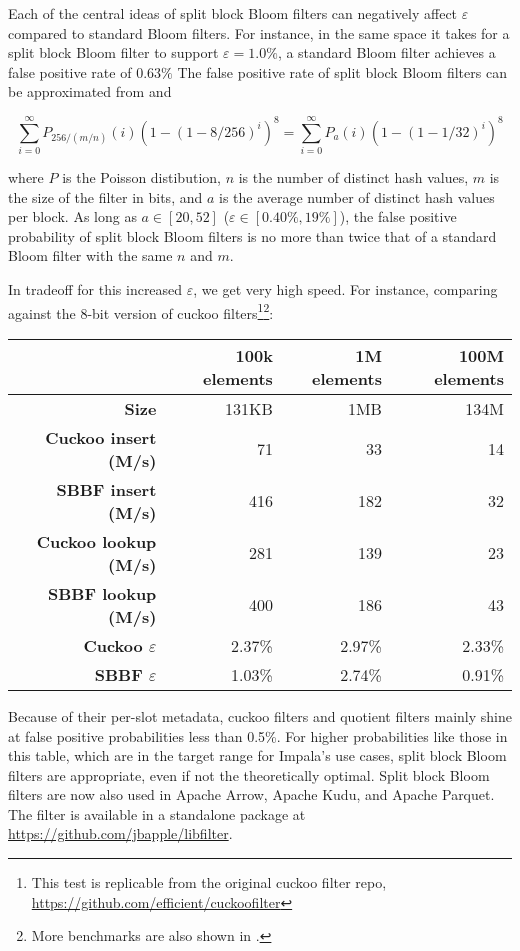 \documentclass[letterpaper, 11pt]{article}
\begin{document}
Each of the central ideas of split block Bloom filters can negatively affect $\varepsilon$ compared to standard Bloom filters.
For instance, in the same space it takes for a split block Bloom filter to support $\varepsilon = 1.0\%$, a standard Bloom filter achieves a false positive rate of $0.63\%$
The false positive rate of split block Bloom filters can be approximated from \cite[Equation 3]{block} and \cite[Section 2.1]{split-bloom}

\[
\sum_{i=0}^\infty P_{256/(m/n)}(i) (1 - (1-8/256)^i)^8
= \sum_{i=0}^\infty P_a(i) (1 - (1-1/32)^i)^8
\]

where $P$ is the Poisson distibution, $n$ is the number of distinct hash values, $m$ is the size of the filter in bits, and $a$ is the average number of distinct hash values per block.
As long as $a \in [20,52]$ ($\varepsilon \in [0.40\%, 19\%]$), the false positive probability of split block Bloom filters is no more than twice that of a standard Bloom filter with the same $n$ and $m$.

In tradeoff for this increased $\varepsilon$, we get very high speed.
For instance, comparing against the 8-bit version of cuckoo filters\footnote{This test is replicable from the original cuckoo filter repo, \url{https://github.com/efficient/cuckoofilter}}\footnote{More benchmarks are also shown in \cite{lemire-xor-filter}.}:

\begin{tabular}{|r|r|r|r|}
  \hline  & {\bf 100k elements} & {\bf 1M elements} & {\bf 100M elements} \\
  \hline {\bf Size} & 131KB & 1MB & 134M \\
  \hline {\bf Cuckoo insert (M/s)} & 71 & 33 & 14 \\
  \hline {\bf SBBF insert (M/s)} & 416 & 182 & 32 \\
  \hline {\bf Cuckoo lookup (M/s)} & 281 & 139 & 23 \\
  \hline {\bf SBBF lookup (M/s)} & 400 & 186 & 43 \\
  \hline {\bf Cuckoo $\varepsilon$} & 2.37\% & 2.97\% & 2.33\% \\
  \hline {\bf SBBF $\varepsilon$} & 1.03\% & 2.74\% & 0.91\% \\
  \hline
\end{tabular}

Because of their per-slot metadata, cuckoo filters and quotient filters mainly shine at false positive probabilities less than 0.5\%.
For higher probabilities like those in this table, which are in the target range for Impala's use cases, split block Bloom filters are appropriate, even if not the theoretically optimal.
Split block Bloom filters are now also used in Apache Arrow, Apache Kudu, and Apache Parquet.
The filter is available in a standalone package at \url{https://github.com/jbapple/libfilter}.
\end{document}
